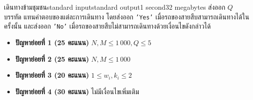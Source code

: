 \documentclass[11pt,a4paper]{article}
\begin{document}
\begin{problem}{เดินทางข้ามชุมชน}{standard input}{standard output}{1 second}{32 megabytes}
\OutputFile
ส่งออก $Q$ บรรทัด แทนคำตอบของแต่ละการเดินทาง โดยส่งออก \texttt{'Yes'} เมื่อรถของสายสืบสามารถเดินทางได้ในครั้งนั้น และส่งออก \texttt{'No'} เมื่อรถของสายสืบไม่สามารถเดินทางด้วยเงื่อนไขดังกล่าวได้

\Scoring
\begin{itemize}

\item \textbf{ปัญหาย่อยที่ 1 (25 คะแนน)} $N, M \leq 1\,000, Q \leq 5$
\item \textbf{ปัญหาย่อยที่ 2 (25 คะแนน)} $N, M \leq 1\,000$
\item \textbf{ปัญหาย่อยที่ 3 (20 คะแนน)} $1 \leq w_i, k_i \leq 2$
\item \textbf{ปัญหาย่อยที่ 4 (30 คะแนน)} ไม่มีเงื่อนไขเพิ่มเติม
\end{itemize}

\Examples

\begin{example}
%
\end{example}

\Examples

\begin{example}
%
\end{example}

\end{problem}
\end{document}
